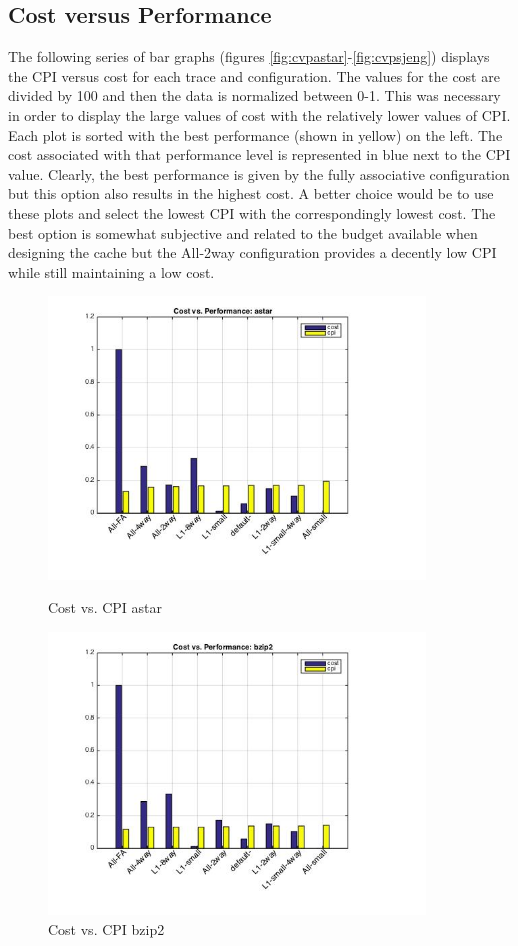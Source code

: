 \documentclass[11pt,titlepage]{article}
\begin{document}
\subsection{Cost versus Performance} \label{sec:costVperf} The following series of bar graphs (figures \ref{fig:cvpastar}-\ref{fig:cvpsjeng}) displays the CPI versus cost for each trace and configuration. The values for the cost are divided by 100 and then the data is normalized between 0-1. This was necessary in order to display the large values of cost with the relatively lower values of CPI. Each plot is sorted with the best performance (shown in yellow) on the left. The cost associated with that performance level is represented in blue next to the CPI value. Clearly, the best performance is given by the fully associative configuration but this option also results in the highest cost. A better choice would be to use these plots and select the lowest CPI with the correspondingly lowest cost. The best option is somewhat subjective and related to the budget available when designing the cache but the All-2way configuration provides a decently low CPI while still maintaining a low cost.
\begin{figure}[H]
  \centering
  \begin{minipage}{.5\textwidth}
    \centering
    \includegraphics[width=10cm]{cvpastar}
    \caption{Cost vs. CPI astar}
    \label{fig:cvpastar}
  \end{minipage}%
  \begin{minipage}{.5\textwidth}
    \centering
    \includegraphics[width=10cm]{cvpbzip2}
    \caption{Cost vs. CPI bzip2}
    \label{fig:cvpbzip2}
  \end{minipage}
\end{figure}
\end{document}
